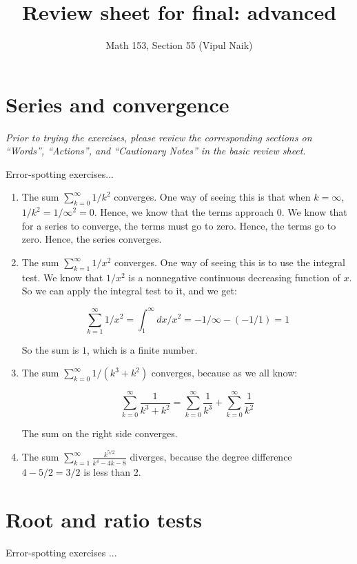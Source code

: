 \documentclass[10pt]{amsart}
\title{Review sheet for final: advanced}
\author{Math 153, Section 55 (Vipul Naik)}
\begin{document}
\maketitle

\section{Series and convergence}

{\em Prior to trying the exercises, please review the corresponding sections on ``Words'',
``Actions'', and ``Cautionary Notes'' in the basic review sheet}.

Error-spotting exercises...

\begin{enumerate}
\item The sum $\sum_{k=0}^\infty 1/k^2$ converges. One way of seeing
  this is that when $k = \infty$, $1/k^2 = 1/\infty^2 = 0$. Hence, we
  know that the terms approach $0$. We know that for a series to
  converge, the terms must go to zero. Hence, the terms go to
  zero. Hence, the series converges.
\item The sum $\sum_{k=1}^\infty 1/x^2$ converges. One way of seeing
  this is to use the integral test. We know that $1/x^2$ is a
  nonnegative continuous decreasing function of $x$. So we can apply
  the integral test to it, and we get:

  $$\sum_{k=1}^\infty 1/x^2 = \int_1^\infty dx/x^2 = -1/\infty - (-1/1) = 1$$

  So the sum is $1$, which is a finite number.
\item The sum $\sum_{k=0}^\infty 1/(k^3 + k^2)$ converges, because as
  we all know:

  $$\sum_{k=0}^\infty \frac{1}{k^3 + k^2} = \sum_{k=0}^\infty \frac{1}{k^3} + \sum_{k=0}^\infty \frac{1}{k^2}$$

  The sum on the right side converges.
\item The sum $\sum_{k=1}^\infty \frac{k^{5/2}}{k^4 - 4k - 8}$ diverges,
  because the degree difference $4 - 5/2 = 3/2$ is less than $2$.
\end{enumerate}

\section{Root and ratio tests}

Error-spotting exercises ...
\end{document}
